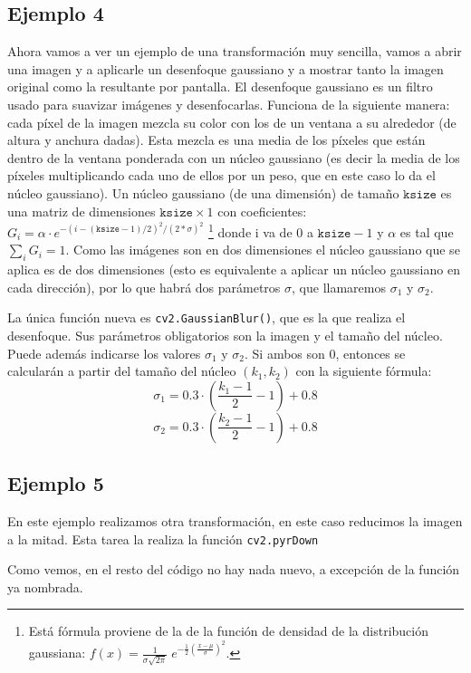 \documentclass[a4paper,openright, 12pt]{book}
\begin{document}
\subsection*{Ejemplo 4}
Ahora vamos a ver un ejemplo de una transformación muy sencilla, vamos a abrir una imagen y a aplicarle un desenfoque gaussiano y a mostrar tanto la imagen original como la resultante por pantalla. El desenfoque gaussiano es un filtro usado para suavizar imágenes y desenfocarlas. Funciona de la siguiente manera: cada píxel de la imagen mezcla su color con los de un ventana a su alrededor (de altura y anchura dadas). Esta mezcla es una media de los píxeles que están dentro de la ventana ponderada con un núcleo gaussiano (es decir la media de los píxeles multiplicando cada uno de ellos por un peso, que en este caso lo da el núcleo gaussiano). Un núcleo gaussiano (de una dimensión) de tamaño $\texttt{ksize}$ es una matriz de dimensiones $ \texttt{ksize}\times1$ con coeficientes:
$ G_i= \alpha \cdot e^{-(i-( \texttt{ksize} -1)/2)^2/(2* \sigma )^2}$ \footnote{Está fórmula proviene de la de la función de densidad de la distribución gaussiana: $f(x)=\frac1{\sigma\sqrt{2\pi}}\; e^{ - \frac{1}{2} \left(\frac{x-\mu}{\sigma}\right)^2}$.} donde i va de $0$ a $\texttt{ksize}-1$ y $\alpha$ es tal que  $\sum_i G_i=1$. Como las imágenes son en dos dimensiones el núcleo gaussiano que se aplica es de dos dimensiones (esto es equivalente a aplicar un núcleo gaussiano en cada dirección), por lo que habrá dos parámetros $\sigma$, que llamaremos $\sigma_1$ y $\sigma_2$.

La única función nueva es 
\lstinline|cv2.GaussianBlur()|, que es la que realiza el desenfoque.
Sus parámetros obligatorios son la imagen y el tamaño del núcleo. Puede además indicarse los valores $\sigma_1$ y $\sigma_2$. Si ambos son 0, entonces se calcularán a partir del tamaño del núcleo $(k_1, k_2)$ con la siguiente fórmula:
\begin{equation*}
\sigma_1 = 0.3\cdot(\frac{k_1-1}{2} - 1) + 0.8
\end{equation*}
\begin{equation*}
\sigma_2 = 0.3\cdot(\frac{k_2-1}{2} - 1) + 0.8
\end{equation*}



\newpage

\subsection*{Ejemplo 5}
En este ejemplo realizamos otra transformación, en este caso reducimos la imagen a la mitad. Esta tarea la realiza la función \lstinline|cv2.pyrDown|

Como vemos, en el resto del código no hay nada nuevo, a excepción de la función ya nombrada.
\newpage
\end{document}
